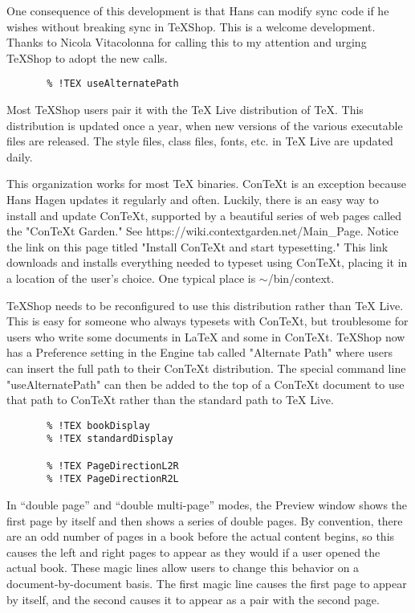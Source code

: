 \documentclass[11pt, oneside]{article}   	%
\begin{document}
One consequence of this development is that Hans can  modify sync code if he wishes without breaking sync in TeXShop. This is a welcome development. Thanks to Nicola Vitacolonna for calling this to my attention and urging TeXShop to adopt the new calls.


\begin{verbatim}
       % !TEX useAlternatePath
\end{verbatim}
 
 Most TeXShop users pair it with the TeX Live distribution of TeX. This distribution is updated once a year, when new versions of the various executable files are released. The style files, class files, fonts, etc. in TeX Live are updated daily.
 
 This organization works for most TeX binaries. ConTeXt is an exception because Hans Hagen updates it regularly and often. Luckily, there is an easy way to install and update ConTeXt, supported by a beautiful series of web pages called the "ConTeXt Garden." See https://wiki.contextgarden.net/Main\_Page. Notice the link on this page titled "Install ConTeXt and start typesetting." This link downloads and installs everything needed to typeset using ConTeXt, placing it in a location of the user's choice. One typical place is $\sim$/bin/context. 
 
TeXShop needs to be reconfigured to use this distribution rather than TeX Live. This is easy for someone who always typesets with ConTeXt, but troublesome for users who write some documents in LaTeX and some in ConTeXt. TeXShop now has a Preference setting in the Engine tab called "Alternate Path" where users can insert the full path to their ConTeXt distribution. The special command line "useAlternatePath" can then be added to the top of a ConTeXt document to use that path to ConTeXt rather than the standard path to TeX Live.

\begin{verbatim}
       % !TEX bookDisplay
       % !TEX standardDisplay
       
       % !TEX PageDirectionL2R
       % !TEX PageDirectionR2L
\end{verbatim}

In ``double page'' and ``double multi-page'' modes, the Preview window shows the first page by itself and then shows a series of double pages. By convention, there are an odd number of pages in a book before the actual content begins, so this causes the left and right pages to appear as they would if a user opened the actual book.  These magic lines allow users to change this behavior on a document-by-document basis. The first magic line causes the first page to appear by itself, and the second causes it to appear as a pair with the second page.
\end{document}
